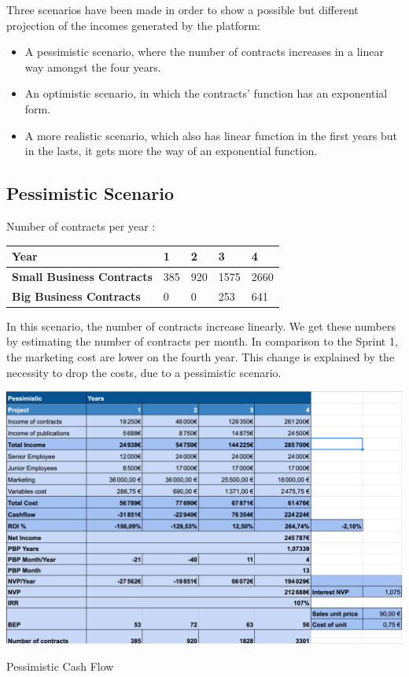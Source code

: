 \documentclass[./main.tex]{subfiles}
\begin{document}
Three scenarios have been made in order to show a possible but different projection of the incomes generated by the platform:
\begin{itemize}
	\item A pessimistic scenario, where the number of contracts increases in a linear way amongst the four years.
	\item An optimistic scenario, in which the contracts’ function has an exponential form.
	\item A more realistic scenario, which also has linear function in the first years but in the lasts, it gets more the way of an exponential function.
\end{itemize}
\subsection{Pessimistic Scenario}
Number of contracts per year : 
\begin{table}[H]
	\centering
\begin{tabular}{|l|l|l|l|l|}
\hline
\textbf{Year}                     & 1  & 2   & 3   & 4   \\ \hline
\textbf{Small Business Contracts} & 385 & 920 & 1575 & 2660 \\ \hline
\textbf{Big Business Contracts}   & 0  & 0   & 253  & 641 \\ \hline
\end{tabular}
\end{table}
In this scenario, the number of contracts increase linearly. We get these numbers by estimating the number of contracts per month.
In comparison to the Sprint 1, the marketing cost are lower on the fourth year. This change is explained by the necessity to drop the costs, due to a pessimistic scenario.
\begin{table}[H]
	\centering
	\includegraphics[width=14cm]{img/pessimistic.png}
	\caption{Pessimistic Cash Flow}
	\label{tab:pessimistic}
\end{table}
\end{document}
